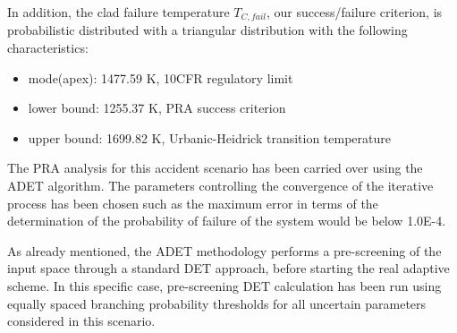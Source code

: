 In addition, the clad failure temperature $T_{C,fail}$, our success/failure criterion, is probabilistic distributed with a triangular distribution with the following characteristics:
\begin{itemize}
\item mode(apex): 1477.59 K, 10CFR regulatory limit
\item lower bound: 1255.37 K, PRA success criterion
\item upper bound: 1699.82 K, Urbanic-Heidrick transition temperature ~\cite{Urbanic1978}
\end{itemize}

The PRA analysis for this accident scenario has been carried over using the ADET algorithm. The parameters controlling the convergence of the iterative process has been chosen such as the maximum error in terms of the determination of the probability of failure of the system would be below 1.0E-4.

As already mentioned, the ADET methodology performs a pre-screening of the input space through a standard DET approach, before starting the real adaptive scheme. In this specific case, pre-screening DET calculation has been run using equally spaced branching probability thresholds for all uncertain parameters considered in this scenario.

